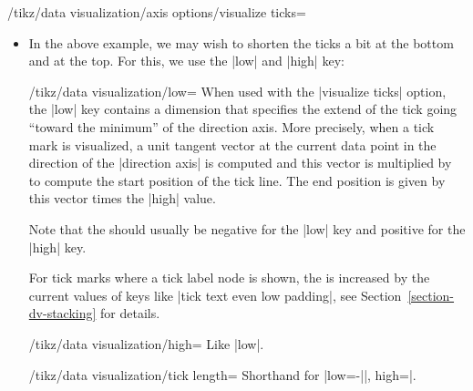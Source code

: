 \begin{key}{/tikz/data visualization/axis options/visualize ticks=}
\begin{itemize}
\begin{codeexample}[]
\tikz \datavisualization [
    our system,
    x axis={attribute=time, length=3cm, ticks=many},
    left axis ={attribute=money},
    right axis={attribute=people},
    visualize as line/.list={people 1, people 2, money 1, money 2}]
  data group {people and money};  
\end{codeexample}    
  \item In the above example, we may wish to shorten the ticks a bit
    at the bottom and at the top. For this, we use the |low| and
    |high| key:
    \begin{key}{/tikz/data visualization/low=}
      When used with the |visualize ticks| option, the |low| key
      contains a dimension that specifies the extend of the tick going
      ``toward the minimum'' of the direction axis. More precisely, when a tick
      mark is visualized, a unit tangent vector at the current data point
      in the direction of the |direction axis| is computed and this
      vector is multiplied by  to compute the start
      position of the tick line. The end position is given by this
      vector times the |high| value.

      Note that the  should usually be negative for
      the |low| key and positive for the |high| key.

      For tick marks where a tick label node is shown, the
       is increased by the current values of keys like
      |tick text even low padding|, see
      Section~\ref{section-dv-stacking} for details.
    \end{key}
    \begin{key}{/tikz/data visualization/high=}
      Like |low|.
    \end{key}
    \begin{key}{/tikz/data visualization/tick length=}
      Shorthand for |low=-||, high=|.
    \end{key}
    

\end{itemize}
\end{key}
